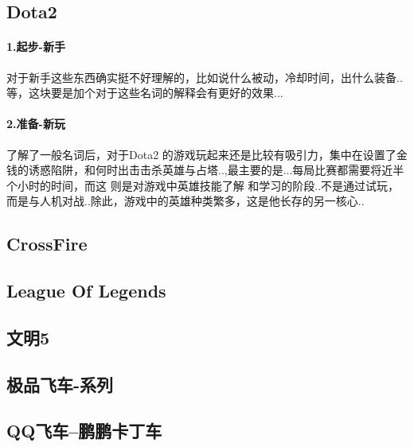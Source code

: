 \documentclass[UTF8,a4paper,8pt]{ctexart}
\begin{document}
	\subsection{Dota2}
		\paragraph{1.起步-新手} 对于新手这些东西确实挺不好理解的，比如说什么被动，冷却时间，出什么装备..等，这块要是加个对于这些名词的解释会有更好的效果...
		
		\paragraph{2.准备-新玩} 了解了一般名词后，对于Dota2 的游戏玩起来还是比较有吸引力，集中在设置了金钱的诱惑陷阱，和何时出击击杀英雄与占塔..,最主要的是...每局比赛都需要将近半个小时的时间，而这 则是对游戏中英雄技能了解 和学习的阶段..不是通过试玩，而是与人机对战..除此，游戏中的英雄种类繁多，这是他长存的另一核心..
	
	\subsection{CrossFire}
	
	\subsection{League Of Legends}
	
	\subsection{文明5}	
    
    \subsection{极品飞车-系列} 
     
    \subsection{QQ飞车--鹏鹏卡丁车}
    
    
    
    
\end{document}
